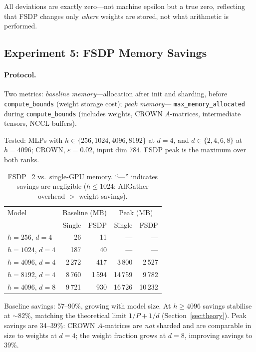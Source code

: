 \documentclass[11pt]{article}
\begin{document}
All deviations are exactly zero---not machine epsilon but a true zero,
reflecting that FSDP changes only \emph{where} weights are stored, not what
arithmetic is performed.

\subsection{Experiment 5: FSDP Memory Savings}

\paragraph{Protocol.}
Two metrics: \emph{baseline memory}---allocation after init and sharding,
before \texttt{compute\_bounds} (weight storage cost); \emph{peak memory}---
\texttt{max\_memory\_allocated} during \texttt{compute\_bounds} (includes
weights, CROWN $A$-matrices, intermediate tensors, NCCL buffers).

Tested: MLPs with $h \in \{256, 1024, 4096, 8192\}$ at $d{=}4$, and
$d \in \{2, 4, 6, 8\}$ at $h{=}4096$; CROWN, $\varepsilon{=}0.02$,
input dim 784. FSDP peak is the maximum over both ranks.

\begin{table}[h]
\caption{FSDP=2 vs.\ single-GPU memory.
``---'' indicates savings are negligible ($h \leq 1024$: AllGather overhead
$>$ weight savings).}
\label{tab:fsdp-memory}
\vskip 0.1in
\begin{center}
\begin{tabular}{lrrrr}
\toprule
Model & \multicolumn{2}{c}{Baseline (MB)} & \multicolumn{2}{c}{Peak (MB)} \\
      & Single & FSDP & Single & FSDP \\
\midrule
$h{=}256$,  $d{=}4$   &    26 &    11 &   --- &   --- \\
$h{=}1024$, $d{=}4$   &   187 &    40 &   --- &   --- \\
$h{=}4096$, $d{=}4$   & 2\,272 &   417 & 3\,800 & 2\,527 \\
$h{=}8192$, $d{=}4$   & 8\,760 & 1\,594 & 14\,759 & 9\,782 \\
$h{=}4096$, $d{=}8$   & 9\,721 &   930 & 16\,726 & 10\,232 \\
\bottomrule
\end{tabular}
\end{center}
\end{table}

Baseline savings: 57--90\%, growing with model size. At $h \geq 4096$ savings
stabilise at ${\sim}82\%$, matching the theoretical limit $1/P + 1/d$
(Section~\ref{sec:theory}). Peak savings are 34--39\%: CROWN $A$-matrices are
\emph{not} sharded and are comparable in size to weights at $d{=}4$;
the weight fraction grows at $d{=}8$, improving savings to 39\%.
\end{document}
